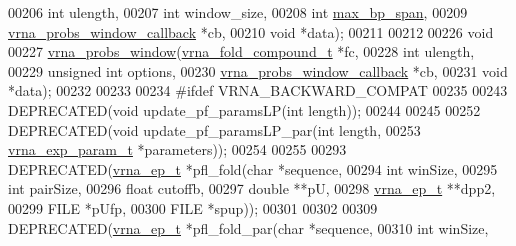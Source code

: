 \begin{DoxyCode}
00206                     \textcolor{keywordtype}{int}                         ulength,
00207                     \textcolor{keywordtype}{int}                         window\_size,
00208                     \textcolor{keywordtype}{int}                         \hyperlink{group__model__details_ga18df869af0d70101106458fc3f027806}{max\_bp\_span},
00209                     \hyperlink{LPfold_8h_abe710a1182e6db69cc75329dfc9bed67}{vrna\_probs\_window\_callback}  *cb,
00210                     \textcolor{keywordtype}{void}                        *data);
00211 
00212 
00226 \textcolor{keywordtype}{void}
00227 \hyperlink{group__local__pf__fold_ga70ec33810fa17a9f67a7c59f156d0137}{vrna\_probs\_window}(\hyperlink{group__fold__compound_structvrna__fc__s}{vrna\_fold\_compound\_t}        *fc,
00228                   \textcolor{keywordtype}{int}                         ulength,
00229                   \textcolor{keywordtype}{unsigned} \textcolor{keywordtype}{int}                options,
00230                   \hyperlink{LPfold_8h_abe710a1182e6db69cc75329dfc9bed67}{vrna\_probs\_window\_callback}  *cb,
00231                   \textcolor{keywordtype}{void}                        *data);
00232 
00233 
00234 \textcolor{preprocessor}{#ifdef  VRNA\_BACKWARD\_COMPAT}
00235 
00243 DEPRECATED(\textcolor{keywordtype}{void} update\_pf\_paramsLP(\textcolor{keywordtype}{int} length));
00244 
00245 
00252 DEPRECATED(\textcolor{keywordtype}{void} update\_pf\_paramsLP\_par(\textcolor{keywordtype}{int}              length,
00253                                        \hyperlink{group__energy__parameters_structvrna__exp__param__s}{vrna\_exp\_param\_t} *parameters));
00254 
00255 
00293 DEPRECATED(\hyperlink{group__struct__utils_structvrna__elem__prob__s}{vrna\_ep\_t} *pfl\_fold(\textcolor{keywordtype}{char}          *sequence,
00294                                \textcolor{keywordtype}{int}           winSize,
00295                                \textcolor{keywordtype}{int}           pairSize,
00296                                \textcolor{keywordtype}{float}         cutoffb,
00297                                \textcolor{keywordtype}{double}        **pU,
00298                                \hyperlink{group__struct__utils_structvrna__elem__prob__s}{vrna\_ep\_t}     **dpp2,
00299                                FILE          *pUfp,
00300                                FILE          *spup));
00301 
00302 
00309 DEPRECATED(\hyperlink{group__struct__utils_structvrna__elem__prob__s}{vrna\_ep\_t} *pfl\_fold\_par(\textcolor{keywordtype}{char}              *sequence,
00310                                       \textcolor{keywordtype}{int}               winSize,

\end{DoxyCode}
